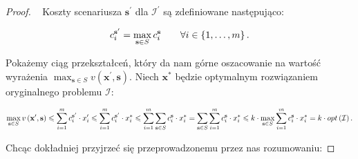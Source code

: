 \begin{proof}~\cite[$430$]{minmaxSurvey}
	Koszty scenariusza $\textbf{s}^{\prime}$ dla $\mathcal{I}^{\prime}$ są zdefiniowane następująco:
	
	\begin{equation}
		c^{\textbf{s}^{\prime}}_{i} = \max_{\mathclap{\textbf{s} \in S}} c^{\textbf{s}}_{i} \qquad \forall i \in \left\{ 1, \dots, m \right\}\text{.}
	\end{equation}
	
	Pokażemy ciąg przekształceń, który da nam górne oszacowanie na wartość wyrażenia $ \max_{\textbf{s} \in S} v \left( \textbf{x}^{\prime}, \textbf{s} \right)$.
	Niech $\textbf{x}^{\ast}$ będzie optymalnym rozwiązaniem oryginalnego problemu $\mathcal{I}$:
	
	\begin{equation}
		\max_{\mathclap{\textbf{s} \in S}} v \left( \textbf{x}^{\prime}, \textbf{s} \right) \leqslant \sum_{\mathclap{i = 1}}^{m} c_{i}^{\textbf{s}^{\prime}} \cdot x_{i}^{\prime} \leqslant \sum_{\mathclap{i = 1}}^{m} c_{i}^{\textbf{s}^{\prime}} \cdot x_{i}^{\ast} \leqslant \sum_{\mathclap{i = 1}}^{m} \sum_{\mathclap{\textbf{s} \in S}} c_{i}^{\textbf{s}} \cdot x_{i}^{\ast} =  \sum_{\mathclap{\textbf{s} \in S}} \sum_{\mathclap{i = 1}}^{m} c_{i}^{\textbf{s}} \cdot x_{i}^{\ast} \leqslant k \cdot \max_{\mathclap{\textbf{s} \in S}} \sum_{\mathclap{i = 1}}^{m} c_{i}^{\textbf{s}} \cdot x_{i}^{\ast} = k \cdot opt \left( \mathcal{I} \right)\text{.}
	\end{equation}
	
	Chcąc dokładniej przyjrzeć się przeprowadzonemu przez nas rozumowaniu:
	

\end{proof}

